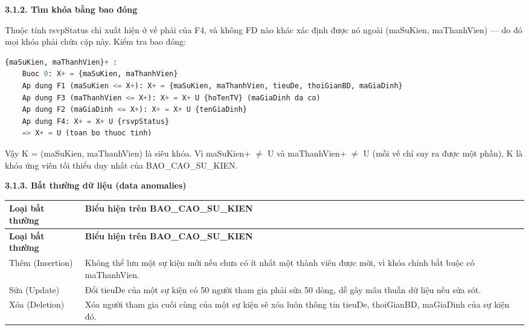 \vspace{1.4em}
{}
{\large\bfseries 3.1.2. Tìm khóa bằng bao đóng}\par\vspace{0.6em}

Thuộc tính rsvpStatus chỉ xuất hiện ở vế phải của F4, và không FD nào khác xác định được nó ngoài (maSuKien, maThanhVien) — do đó mọi khóa phải chứa cặp này. Kiểm tra bao đóng:

\begin{lstlisting}[language=SQL]
	{maSuKien, maThanhVien}+ :
	Buoc 0: X+ = {maSuKien, maThanhVien}
	Ap dung F1 (maSuKien <= X+): X+ = {maSuKien, maThanhVien, tieuDe, thoiGianBD, maGiaDinh}
	Ap dung F3 (maThanhVien <= X+): X+ = X+ U {hoTenTV} (maGiaDinh da co)
	Ap dung F2 (maGiaDinh <= X+): X+ = X+ U {tenGiaDinh}
	Ap dung F4: X+ = X+ U {rsvpStatus}
	=> X+ = U (toan bo thuoc tinh)
\end{lstlisting}

Vậy K = (maSuKien, maThanhVien) là siêu khóa. Vì maSuKien+ $\neq$ U và maThanhVien+ $\neq$ U (mỗi vế chỉ suy ra được một phần), K là khóa ứng viên tối thiểu duy nhất của BAO\_CAO\_SU\_KIEN.

\vspace{1.4em}
{}
{\large\bfseries 3.1.3. Bất thường dữ liệu (data anomalies)}\par\vspace{0.6em}

\begingroup
\renewcommand{\arraystretch}{1.25}
\setlength{\tabcolsep}{5pt}
\begin{longtable}{|>{\raggedright\arraybackslash}p{}|>{\raggedright\arraybackslash}p{}|}
	\hline
	\textbf{Loại bất thường} & \textbf{Biểu hiện trên BAO\_CAO\_SU\_KIEN} \\ \hline
	\endfirsthead
	\hline
	\textbf{Loại bất thường} & \textbf{Biểu hiện trên BAO\_CAO\_SU\_KIEN} \\ \hline
	\endhead
	Thêm (Insertion) & Không thể lưu một sự kiện mới nếu chưa có ít nhất một thành viên được mời, vì khóa chính bắt buộc có maThanhVien. \\ \hline
	Sửa (Update) & Đổi tieuDe của một sự kiện có 50 người tham gia phải sửa 50 dòng, dễ gây mâu thuẫn dữ liệu nếu sửa sót. \\ \hline
	Xóa (Deletion) & Xóa người tham gia cuối cùng của một sự kiện sẽ xóa luôn thông tin tieuDe, thoiGianBD, maGiaDinh của sự kiện đó. \\ \hline
\end{longtable}
\endgroup

